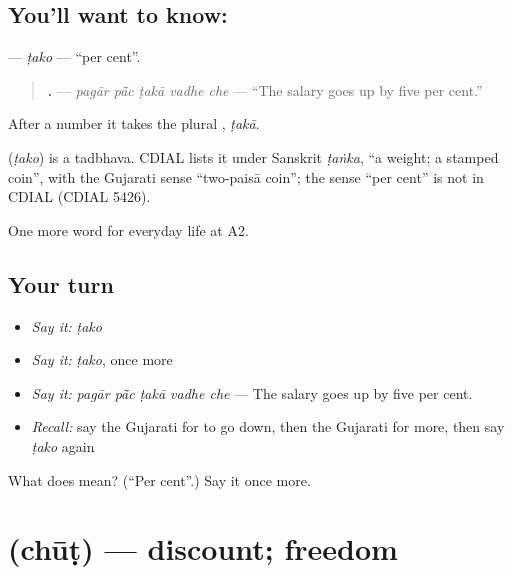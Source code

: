 \subsection*{You'll want to know: }
\textbf{} — \emph{ṭako} — \textquotedblleft{}per cent\textquotedblright{}.

\begin{quote}
\textbf{    .} — \emph{pagār pā̃c ṭakā vadhe che} — \textquotedblleft{}The salary goes up by five per cent.\textquotedblright{}
\end{quote}

After a number it takes the plural \textbf{}, \emph{ṭakā}.

\begin{cousinweb}
\textbf{} (\emph{ṭako}) is a tadbhava. CDIAL lists it under Sanskrit \emph{ṭaṅka}, \textquotedblleft{}a weight; a stamped coin\textquotedblright{}, with the Gujarati sense \textquotedblleft{}two-paisā coin\textquotedblright{}; the sense \textquotedblleft{}per cent\textquotedblright{} is not in CDIAL (CDIAL 5426).
\end{cousinweb}

\begin{grammarlens}[title={What you've built}]
One more word for everyday life at A2.
\end{grammarlens}

\subsection*{Your turn}
\begin{itemize}
\raggedright
  \item \emph{Say it:} \emph{ṭako}
  \item \emph{Say it:} \emph{ṭako}, once more
  \item \emph{Say it:} \emph{pagār pā̃c ṭakā vadhe che} — The salary goes up by five per cent.
  \item \emph{Recall:} say the Gujarati for to go down, then the Gujarati for more, then say \emph{ṭako} again
\end{itemize}

\begin{tcolorbox}[breakable,colback=teal!4,colframe=teal!35!black,title={Before you move on}]
What does  mean? (\textquotedblleft{}Per cent\textquotedblright{}.) Say it once more.
\end{tcolorbox}
\section[\texorpdfstring{\gu{છૂટ} (chūṭ)}{છૂટ (chūṭ)}]{ (chūṭ) — discount; freedom}

